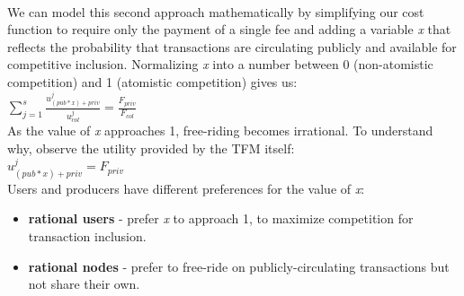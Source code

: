 \documentclass[11pt,a4paper]{llncs}
\begin{document}
\vspace{0.2cm} \\
We can model this second approach mathematically by simplifying our cost function to require only the payment of a single fee and adding a variable \textit{x} that reflects the probability that transactions are circulating publicly and available for competitive inclusion. Normalizing \textit{x} into a number between 0 (non-atomistic competition) and 1 (atomistic competition) gives us:
\vspace{0.2cm} \\
\LARGE
\begin{math}
\sum_{j=1}^{s} \frac{u_{({pub}*{x})+{priv}}^j}{u_{col}^j} = \frac{F_{{priv}}}{F_{col}}
\end{math}
\normalsize
\vspace{0.2cm} \\
As the value of \textit{x} approaches 1, free-riding becomes irrational. To understand why, observe the utility provided by the TFM itself:
\vspace{0.2cm} \\
\LARGE
\begin{math}
u_{\left({pub}*{x}\right)+{priv}}^j = F_{priv}
\end{math}
\normalsize
\vspace{0.2cm} \\
Users and producers have different preferences for the value of \textit{x}:
\vspace{0.2cm} \\
\begin{itemize}
  \item \textbf{rational users} - prefer \textit{x} to approach 1, to maximize competition for transaction inclusion.
  \item \textbf{rational nodes} - prefer to free-ride on publicly-circulating transactions but not share their own.
\end{itemize}
\end{document}
